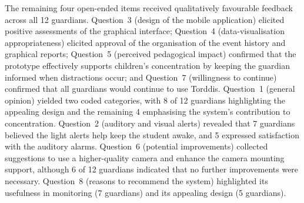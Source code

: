 The remaining four open-ended items received qualitatively favourable feedback across all 12 guardians. Question~3 (design of the mobile application) elicited positive assessments of the graphical interface; Question~4 (data-visualisation appropriateness) elicited approval of the organisation of the event history and graphical reports; Question~5 (perceived pedagogical impact) confirmed that the prototype effectively supports children's concentration by keeping the guardian informed when distractions occur; and Question~7 (willingness to continue) confirmed that all guardians would continue to use Torddis. Question~1 (general opinion) yielded two coded categories, with 8 of 12 guardians highlighting the appealing design and the remaining 4 emphasising the system's contribution to concentration. Question~2 (auditory and visual alerts) revealed that 7 guardians believed the light alerts help keep the student awake, and 5 expressed satisfaction with the auditory alarms. Question~6 (potential improvements) collected suggestions to use a higher-quality camera and enhance the camera mounting support, although 6 of 12 guardians indicated that no further improvements were necessary. Question~8 (reasons to recommend the system) highlighted its usefulness in monitoring (7 guardians) and its appealing design (5 guardians).

